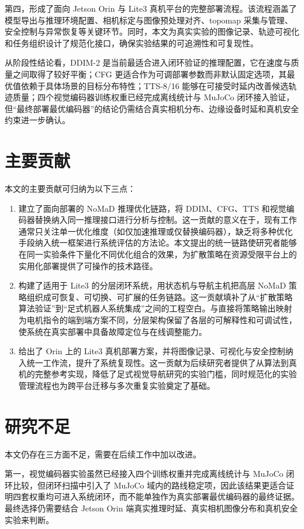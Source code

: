 第四，形成了面向 Jetson Orin 与 Lite3 真机平台的完整部署流程。该流程涵盖了模型导出与推理环境配置、相机标定与图像预处理对齐、topomap 采集与管理、安全控制与异常恢复等关键环节。同时，本文为真实实验的图像记录、轨迹可视化和任务组织设计了规范化接口，确保实验结果的可追溯性和可复现性。

从阶段性结论看，DDIM-2 是当前最适合进入闭环验证的推理配置，它在速度与质量之间取得了较好平衡；CFG 更适合作为可调部署参数而非默认固定选项，其最优值依赖于具体场景的目标分布特性；TTS-8/16 能够在可接受时延内改善候选轨迹质量；四个视觉编码器训练权重已经完成离线统计与 MuJoCo 闭环接入验证，但``最终部署最优编码器''的结论仍需结合真实相机分布、边缘设备时延和真机安全约束进一步确认。

\section{主要贡献}

本文的主要贡献可归纳为以下三点：
\begin{enumerate}
    \item 建立了面向部署的 NoMaD 推理优化链路，将 DDIM、CFG、TTS 和视觉编码器替换纳入同一推理接口进行分析与控制。这一贡献的意义在于，现有工作通常只关注单一优化维度（如仅加速推理或仅替换编码器），缺乏将多种优化手段纳入统一框架进行系统评估的方法论。本文提出的统一链路使研究者能够在同一实验条件下量化不同优化组合的效果，为扩散策略在资源受限平台上的实用化部署提供了可操作的技术路径。
    \item 构建了适用于 Lite3 的分层闭环系统，用状态机与导航主机把高层 NoMaD 策略组织成可恢复、可切换、可扩展的任务链路。这一贡献填补了从``扩散策略算法验证''到``足式机器人系统集成''之间的工程空白。与直接将策略输出映射为电机指令的端到端方案不同，分层架构保留了各层的可解释性和可调试性，使系统在真实部署中具备故障定位与在线调整能力。
    \item 给出了 Orin 上的 Lite3 真机部署方案，并将图像记录、可视化与安全控制纳入统一工作流，提升了系统复现性。这一贡献为后续研究者提供了从算法到真机的完整参考实现，降低了足式视觉导航研究的实验门槛，同时规范化的实验管理流程也为跨平台迁移与多次重复实验奠定了基础。
\end{enumerate}

\section{研究不足}

本文仍存在三方面不足，需要在后续工作中加以改进。

第一，视觉编码器实验虽然已经接入四个训练权重并完成离线统计与 MuJoCo 闭环比较，但闭环扫描中引入了 MuJoCo 域内的路线稳定项，因此该结果更适合证明四套权重均可进入系统闭环，而不能单独作为真实部署最优编码器的最终证据。最终选择仍需要结合 Jetson Orin 端真实推理时延、真实相机图像分布和真机安全实验来判断。


